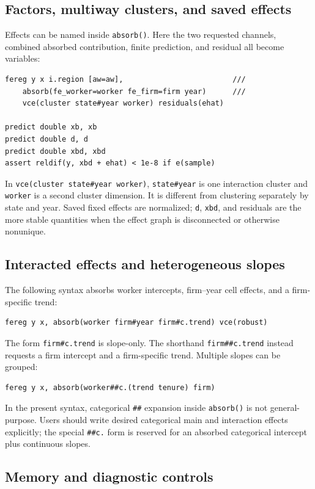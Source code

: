 \documentclass[11pt]{article}
\begin{document}
\subsection{Factors, multiway clusters, and saved effects}

Effects can be named inside \texttt{absorb()}.  Here the two requested
channels, combined absorbed contribution, finite prediction, and residual all
become variables:
\begin{lstlisting}
fereg y x i.region [aw=aw],                         ///
    absorb(fe_worker=worker fe_firm=firm year)      ///
    vce(cluster state#year worker) residuals(ehat)

predict double xb, xb
predict double d, d
predict double xbd, xbd
assert reldif(y, xbd + ehat) < 1e-8 if e(sample)
\end{lstlisting}
In \texttt{vce(cluster state\#year worker)}, \texttt{state\#year} is one
interaction cluster and \texttt{worker} is a second cluster dimension.  It is
different from clustering separately by state and year.  Saved fixed effects
are normalized; \texttt{d}, \texttt{xbd}, and residuals are the more stable
quantities when the effect graph is disconnected or otherwise nonunique.

\subsection{Interacted effects and heterogeneous slopes}

The following syntax absorbs worker intercepts, firm--year cell effects, and
a firm-specific trend:
\begin{lstlisting}
fereg y x, absorb(worker firm#year firm#c.trend) vce(robust)
\end{lstlisting}
The form \texttt{firm\#c.trend} is slope-only.  The shorthand
\texttt{firm\#\#c.trend} instead requests a firm intercept and a firm-specific
trend.  Multiple slopes can be grouped:
\begin{lstlisting}
fereg y x, absorb(worker##c.(trend tenure) firm)
\end{lstlisting}
In the present syntax, categorical \texttt{\#\#} expansion inside
\texttt{absorb()} is not general-purpose.  Users should write desired
categorical main and interaction effects explicitly; the special
\texttt{\#\#c.} form is reserved for an absorbed categorical intercept plus
continuous slopes.

\subsection{Memory and diagnostic controls}
\end{document}
